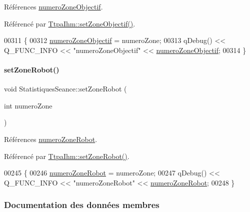 Références \hyperlink{class_statistiques_seance_a23226867e4a34cb41f8c07f3d8d42e49}{numero\+Zone\+Objectif}.



Référencé par \hyperlink{class_ttpa_ihm_a3fd5b5d097f8a52df6fc8dd6d59b1374}{Ttpa\+Ihm\+::set\+Zone\+Objectif()}.


\begin{DoxyCode}
00311 \{
00312     \hyperlink{class_statistiques_seance_a23226867e4a34cb41f8c07f3d8d42e49}{numeroZoneObjectif} = numeroZone;
00313     qDebug() << Q\_FUNC\_INFO << \textcolor{stringliteral}{"numeroZoneObjectif"} << \hyperlink{class_statistiques_seance_a23226867e4a34cb41f8c07f3d8d42e49}{numeroZoneObjectif};
00314 \}
\end{DoxyCode}
\mbox{\label{class_statistiques_seance_a97a0cf5b45add60d7a3e31207fe360a0}} 
\paragraph{\texorpdfstring{set\+Zone\+Robot()}{setZoneRobot()}}
{\footnotesize\ttfamily void Statistiques\+Seance\+::set\+Zone\+Robot (\begin{DoxyParamCaption}\item[{int}]{numero\+Zone }\end{DoxyParamCaption})}



Références \hyperlink{class_statistiques_seance_aeea50e7fc9b2308e365f77f27e3f86ee}{numero\+Zone\+Robot}.



Référencé par \hyperlink{class_ttpa_ihm_abda1a93ec09ec404b129e08876faa5f8}{Ttpa\+Ihm\+::set\+Zone\+Robot()}.


\begin{DoxyCode}
00245 \{
00246     \hyperlink{class_statistiques_seance_aeea50e7fc9b2308e365f77f27e3f86ee}{numeroZoneRobot} = numeroZone;
00247     qDebug() << Q\_FUNC\_INFO << \textcolor{stringliteral}{"numeroZoneRobot"} << \hyperlink{class_statistiques_seance_aeea50e7fc9b2308e365f77f27e3f86ee}{numeroZoneRobot};
00248 \}
\end{DoxyCode}


\subsubsection{Documentation des données membres}
\mbox{\label{class_statistiques_seance_a36681be0a5a9fc48c4c332606a0418ad}} 
